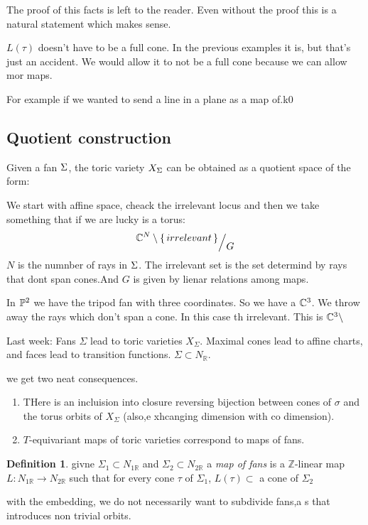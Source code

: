 \documentclass[12pt]{memoir}
\theoremstyle{definition}
\newtheorem{protodefinition}{Definition}[section]
\newenvironment{define}
   {\begin{protodefinition}}
   {\end{protodefinition}}
\def\ZZ{{\mathbb Z}}
\def\RR{{\mathbb R}}
\begin{document}
The proof of this facts is left to the reader. Even without the proof this is a natural statement which makes sense.
\begin{significant}
    $L(\tau)$ doesn't have to be a full cone. In the previous examples it is, but that's just an accident. We would allow it to not be a full cone because we can allow mor maps.
\end{significant}
For example if we wanted to send a line in a plane as a map of.k0

\subsection{Quotient construction}

Given a fan $\Sigma$, the toric variety $X_\Sigma$ can be obtained as a quotient space of the form:\par 
We start with affine space, cheack the irrelevant locus and then we take something that if we are lucky is a torus:
$$\quot{\bC^N\less\set{irrelevant}}{G}$$
$N$ is the numnber of rays in $\Sigma$. The irrelevant set is the set determind by rays that dont span cones.And $G$ is given by lienar relations among maps. 

\begin{Ex}
In $\mathbb{P}^2$  we have the tripod fan with three coordinates. So we have a $\mathbb{C}^3$. We throw away the rays which don't span a cone. In this case th irrelevant. This is $\mathbb{C}^3\setminus$ 
\end{Ex}


Last week: Fans $\Sigma$ lead to toric varieties $X_\Sigma$. Maximal cones lead to affine charts, and faces lead to transition functions. $\Sigma \subset N_\RR$. 


we get two neat consequences.
\begin{enumerate}
    \item THere is an incluision into closure reversing bijection between cones of $\sigma$ and the torus orbits of $X_\Sigma$ (also,e xhcanging dimension with co dimension).
    \item $T$-equivariant maps of toric varieties correspond to maps of fans.
\end{enumerate}

\begin{define}
    givne $\Sigma_1 \subset N_{1\RR}$ and $\Sigma_2 \subset N_{2\RR}$ a \emph{map of fans} is a $\ZZ$-linear map $L: N_{1\RR}\rightarrow N_{2\RR}$ such that for every cone $\tau$ of $\Sigma_1$, $L(\tau) \subset $ a cone of $\Sigma_2$
\end{define}
with the embedding, we do not necessarily want to subdivide fans,a s that introduces non trivial orbits.
\end{document}
